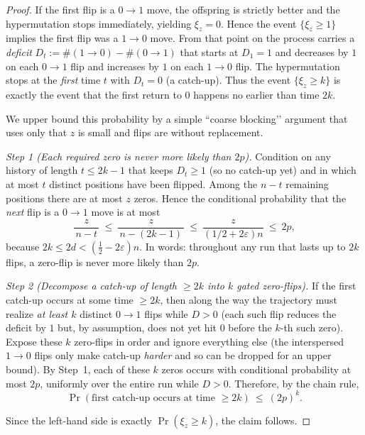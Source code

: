 \documentclass[lettersize,journal]{IEEEtran}
\begin{document}
\begin{proof}
	If the first flip is a $0\!\to 1$ move, the offspring is strictly better and the hypermutation stops immediately, yielding $\xi_z=0$. Hence the event $\{\xi_z\ge 1\}$ implies the first flip was a $1\!\to 0$ move. From that point on the process carries a \emph{deficit} $D_t:=\#(1\!\to 0)-\#(0\!\to 1)$ that starts at $D_1=1$ and decreases by $1$ on each $0\!\to 1$ flip and increases by $1$ on each $1\!\to 0$ flip. The hypermutation stops at the \emph{first} time $t$ with $D_t=0$ (a catch-up). Thus the event $\{\xi_z\ge k\}$ is exactly the event that the first return to $0$ happens no earlier than time $2k$.
	
	We upper bound this probability by a simple ``coarse blocking’’ argument that uses only that $z$ is small and flips are without replacement.
	
	\smallskip
	\emph{Step 1 (Each required zero is never more likely than $2p$).}
	Condition on any history of length $t\le 2k-1$ that keeps $D_t\ge 1$ (so no catch-up yet) and in which at most $t$ distinct positions have been flipped. Among the $n-t$ remaining positions there are at most $z$ zeros. Hence the conditional probability that the \emph{next} flip is a $0\!\to 1$ move is at most
	\[
	\frac{z}{\,n-t\,}\ \le\ \frac{z}{\,n-(2k-1)\,}\ \le\ \frac{z}{(1/2+2\varepsilon)n}\ \le\ 2p,
	\]
	because $2k\le 2d<(\tfrac12-2\varepsilon)n$. In words: throughout any run that lasts up to $2k$ flips, a zero-flip is never more likely than $2p$.
	
	\smallskip
	\emph{Step 2 (Decompose a catch-up of length $\ge 2k$ into $k$ gated zero-flips).}
	If the first catch-up occurs at some time $\ge 2k$, then along the way the trajectory must realize \emph{at least $k$} distinct $0\!\to 1$ flips while $D>0$ (each such flip reduces the deficit by $1$ but, by assumption, does not yet hit $0$ before the $k$-th such zero). Expose these $k$ zero-flips in order and ignore everything else (the interspersed $1\!\to 0$ flips only make catch-up \emph{harder} and so can be dropped for an upper bound). By Step~1, each of these $k$ zeros occurs with conditional probability at most $2p$, uniformly over the entire run while $D>0$. Therefore, by the chain rule,
	\[
	\Pr(\text{first catch-up occurs at time }\ge 2k)\ \le\ (2p)^k.
	\]
	
		
	Since the left-hand side is exactly $\Pr(\xi_z\ge k)$, the claim follows.
\end{proof}
\end{document}
